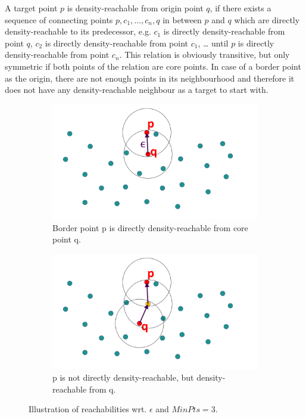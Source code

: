 A target point $p$ is density-reachable from origin point $q$, if there exists a sequence of connecting points $p, c_1, \dotsc, c_n, q$ in between $p$ and $q$ which are directly density-reachable to its predecessor, e.g. $c_1$ is directly density-reachable from point $q$, $c_2$ is directly density-reachable from point $c_1$, \dots{} until $p$ is directly density-reachable from point $c_n$. 
This relation is obviously transitive, but only symmetric if both points of the relation are core points. In case of a border point as the origin, there are not enough points in its neighbourhood and therefore it does not have any density-reachable neighbour as a target to start with.

\begin{figure}
    \centering
    \begin{subfigure}[t]{.5\textwidth}
      \centering  
      \captionsetup{width=.9\linewidth}
      \includegraphics[width=.8\textwidth]{figures_method/dbscan_direct_dreach.pdf}
      \caption{Border point p is directly density-reachable from core point q.}
    \end{subfigure}%
    \begin{subfigure}[t]{.5\textwidth}
      \centering
      \captionsetup{width=.9\linewidth}
      \includegraphics[width=.8\textwidth]{figures_method/dbscan_dreach.pdf}
      \caption{p is not directly density-reachable, but density-reachable from q.}
    \end{subfigure}
    \caption{Illustration of reachabilities wrt. $\epsilon$ and $MinPts = 3$.}
    \label{fig:directdensityreachable}
\end{figure}

